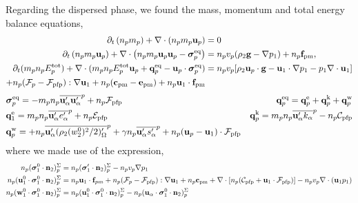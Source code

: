 Regarding the dispersed phase, we found the mass, momentum and total energy balance equations, 
\begin{align*}
    \partial_t \left(n_p m_p\right)
    + \mathbf{\nabla}\cdot \left(n_pm_p\textbf{u}_p
    \right)
    &= 
    0\\
    \partial_t \left(n_p m_p \textbf{u}_p\right)
    + \mathbf{\nabla}\cdot \left(n_p
    m_p \textbf{u}_p \textbf{u}_p 
    - \bm{\sigma}_p^\text{eq}
    \right)
    &= 
    n_p v_p  (  
    \rho_2 \textbf{g}
    - \mathbf{\nabla} p_1)
    + n_p \textbf{f}_\text{pm},\\
    \partial_t(m_p n_pE_p^\text{tot})
    + \mathbf{\nabla}\cdot(m_pn_p E_p^\text{tot} \textbf{u}_p 
    + \textbf{q}_p^\text{eq} - \textbf{u}_p \cdot \bm{\sigma}_p^\text{eq})
    &=  n_p v_p [\rho_2 \textbf{u}_p\cdot  \textbf{g} 
    - \textbf{u}_1 \cdot \mathbf{\nabla} p_1  -  p_1 \mathbf{\nabla}\cdot \textbf{u}_1]\\
    + n_p (\mathcal{F}_p - \mathcal{F}_\text{pfp}):\mathbf{\nabla} \textbf{u}_1
    + n_p (\textbf{c}_\text{pm}
    - \textbf{e}_\text{pm})
    + n_p \textbf{u}_1 \cdot \textbf{f}_\text{pm}
\end{align*}
\begin{align*}
    &\bm{\sigma}_p^\text{eq}
    = -  m_pn_p\overline{\textbf{u}_\alpha'\textbf{u}_\alpha'}^{p}
        + n_p \mathcal{F}_\text{pfp} 
    &\textbf{q}_p^\text{eq}
    =\textbf{q}_p^\text{e} 
    +\textbf{q}_p^\text{k}  
    +\textbf{q}_p^\text{w}  
    \\
    &\textbf{q}_1^\text{e}
    = m_p n_p\overline{\textbf{u}_\alpha' e_\alpha'}^{p} 
    + n_p \mathcal{E}_\text{pfp} 
    &\textbf{q}_p^\text{k}
    = m_p n_p\overline{\textbf{u}_\alpha' k_\alpha}^{p} 
    - n_p \mathcal{C}_\text{pfp} 
    \\
    &\textbf{q}_p^\text{w}
    = 
    + n_p\overline{\textbf{u}_\alpha'(\rho_2 (w^0_2)^2/2 )'_\Omega}^{p}
    + \gamma n_p\overline{\textbf{u}_\alpha' s_\alpha'}^{p}
    + n_p (\textbf{u}_p - \textbf{u}_1)\cdot \mathcal{F}_\text{pfp} 
\end{align*}
where we made use of the expression, 
\begin{align*}
    n_p (\bm{\sigma}_1^0 \cdot  \textbf{n}_2)^\Sigma_p
    &= 
    n_p ( \bm{\sigma}_1' \cdot  \textbf{n}_2)^\Sigma_p
    - n_p v_p \mathbf{\nabla} p_1\\
    n_p (\textbf{u}_1^0 \cdot \bm{\sigma}_1^0 \cdot  \textbf{n}_2)^\Sigma_p
    &= 
    n_p \textbf{u}_1 \cdot \textbf{f}_{pm}
    + n_p (\mathcal{F}_p - \mathcal{F}_\text{pfp}): \mathbf{\nabla} \textbf{u}_1
    + n_p \textbf{c}_\text{pm}
    + \mathbf{\nabla}\cdot [n_p(\mathcal{C}_\text{pfp} + \textbf{u}_1 \cdot \mathcal{F}_\text{pfp})]
    - n_p v_p \mathbf{\nabla}\cdot (\textbf{u}_1 p_1) \\
    n_p (\textbf{w}_1^0 \cdot \bm{\sigma}_1^0 \cdot  \textbf{n}_2)^\Sigma_p
    &= 
    n_p (\textbf{u}_1^0 \cdot \bm{\sigma}_1^0 \cdot  \textbf{n}_2)^\Sigma_p
    - n_p (\textbf{u}_\alpha \cdot \bm{\sigma}_1^0 \cdot  \textbf{n}_2)^\Sigma_p
\end{align*}
